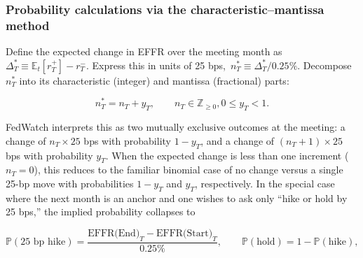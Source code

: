 \subsubsection{Probability calculations via the characteristic–mantissa method}

Define the expected change in EFFR over the meeting month as $\Delta_T^{*} \equiv \mathbb{E}_t[r_T^{+}] - r_T^{-}$. Express this in units of 25 bps, $\,n_T^{*} \equiv \Delta_T^{*}/0.25\%$. Decompose $n_T^{*}$ into its characteristic (integer) and mantissa (fractional) parts:

$$
n_T^{*} = n_T + y_T,\qquad n_T \in \mathbb{Z}_{\ge 0}, 0 \le y_T < 1.
$$

FedWatch interprets this as two mutually exclusive outcomes at the meeting: a change of $n_T \times 25$ bps with probability $1-y_T$, and a change of $(n_T{+}1)\times 25$ bps with probability $y_T$. When the expected change is less than one increment ($n_T=0$), this reduces to the familiar binomial case of no change versus a single 25-bp move with probabilities $1-y_T$ and $y_T$, respectively. In the special case where the next month is an anchor and one wishes to ask only “hike or hold by 25 bps,” the implied probability collapses to

$$
\mathbb{P}(\text{25 bp hike}) 
= \frac{\text{EFFR(End)}_{T}-\text{EFFR(Start)}_{T}}{0.25\%},
\qquad 
\mathbb{P}(\text{hold})=1-\mathbb{P}(\text{hike}),
$$

